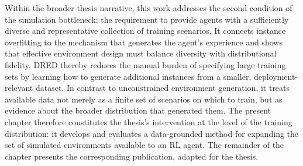 Within the broader thesis narrative, this work addresses the second condition of the simulation bottleneck: the requirement to provide agents with a sufficiently diverse and representative collection of training scenarios. It connects instance overfitting to the mechanism that generates the agent's experience and shows that effective environment design must balance diversity with distributional fidelity. DRED thereby reduces the manual burden of specifying large training sets by learning how to generate additional instances from a smaller, deployment-relevant dataset. In contrast to unconstrained environment generation, it treats available data not merely as a finite set of scenarios on which to train, but as evidence about the broader distribution that generated them.  The present chapter therefore constitutes the thesis's intervention at the level of the training distribution: it develops and evaluates a data-grounded method for expanding the set of simulated environments available to an RL agent. The remainder of the chapter presents the corresponding publication, adapted for the thesis.

\clearpage

